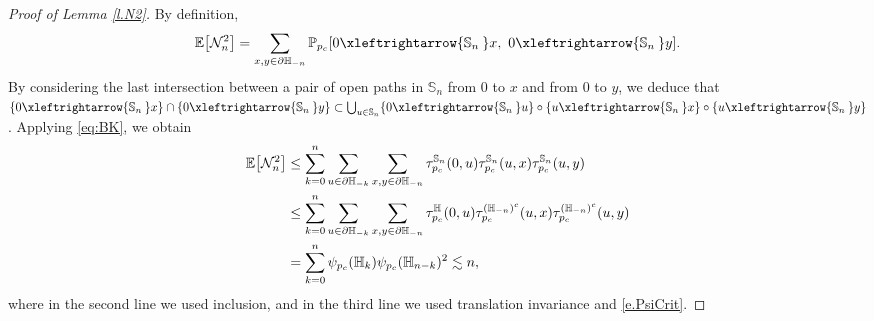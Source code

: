 \documentclass[11pt,a4paper]{article}
\numberwithin{equation}{section}
\theoremstyle{plain}
\theoremstyle{definition}
\newcommand{\connect}{\xleftrightarrow}
\newcommand{\1}{\mathbf 1}
\def\H{\mathbb{H}}
\def\P{\mathbb{P}} %
\def\E{\mathbb{E}} %
\def\md{\mid}
\def\Bb#1#2{{\def\md{\bigm| }#1\bigl[#2\bigr]}}
\def\Eb{\Bb\E}
\def\bf{\bfseries}
\begin{document}
\begin{proof}[Proof of Lemma \textup{\ref{l.N2}}]
	By definition, 
	\begin{equation}
		\Eb{\mathcal N_n^2}=\sum_{x,y\in \partial \H_{-n}}  \P_{p_c}[0\connect{\mathbb{S}_n\:}x,~0\connect{\mathbb{S}_n\:}y].
	\end{equation}
	By considering the last intersection between a pair of open paths in $\mathbb{S}_n$ from $0$ to $x$ and from $0$ to $y$, we deduce that $\{0\connect{\mathbb{S}_n\:}x\}\cap \{0\connect{\mathbb{S}_n\:}y \} \subset \bigcup_{u\in \mathbb{S}_n} \{0\connect{\mathbb{S}_n\:}u\} \circ \{u\connect{\mathbb{S}_n\:}x\} \circ \{u\connect{\mathbb{S}_n\:}y\}$. Applying \eqref{eq:BK}, we obtain
	\begin{align}\label{eq:proof lb half space 1}
	\begin{split}
		\Eb{\mathcal N_n^2}&\leq \sum_{k=0}^n \sum_{u\in \partial \H_{-k}} \sum_{x,y\in \partial\H_{-n}} \tau_{p_c}^{\mathbb{S}_n}(0,u) \tau_{p_c}^{\mathbb{S}_n}(u,x) \tau_{p_c}^{\mathbb{S}_n}(u,y) \\
		&\leq \sum_{k=0}^n \sum_{u\in \partial \H_{-k}} \sum_{x,y\in \partial\H_{-n}} \tau_{p_c}^{\H}(0,u) \tau_{p_c}^{(\mathbb H_{-n})^c}(u,x) \tau_{p_c}^{(\H_{-n})^c}(u,y) \\
		&=\sum_{k=0}^n \psi_{p_c}(\H_k) \psi_{p_c}(\H_{n-k})^2 \lesssim n,
		\end{split}
	\end{align}
	where in the second line we used inclusion, and in the third line we used translation invariance and \eqref{e.PsiCrit}.
\end{proof}
\end{document}
